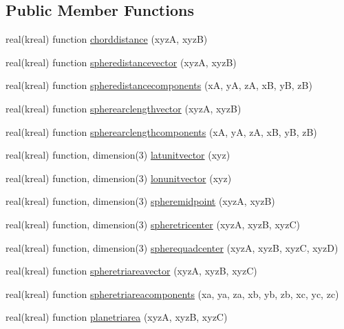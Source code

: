 \subsection*{Public Member Functions}
\begin{DoxyCompactItemize}
\item 
real(kreal) function \hyperlink{classspheregeommodule_aad8e24c2e0fcaed63257a035dd75164d}{chorddistance} (xyz\+A, xyz\+B)
\item 
real(kreal) function \hyperlink{classspheregeommodule_a7649a8382de0b1490ba0baf2a554d430}{spheredistancevector} (xyz\+A, xyz\+B)
\item 
real(kreal) function \hyperlink{classspheregeommodule_a5e3a3578ed0119cf1082a34071e46531}{spheredistancecomponents} (x\+A, y\+A, z\+A, x\+B, y\+B, z\+B)
\item 
real(kreal) function \hyperlink{classspheregeommodule_a45bc66c78ad0038406b7520f20fde3c1}{spherearclengthvector} (xyz\+A, xyz\+B)
\item 
real(kreal) function \hyperlink{classspheregeommodule_af1c6c8b85f05774efc228e087da7ea8c}{spherearclengthcomponents} (x\+A, y\+A, z\+A, x\+B, y\+B, z\+B)
\item 
real(kreal) function, dimension(3) \hyperlink{classspheregeommodule_ac645580642ca887dfc32d3f079817474}{latunitvector} (xyz)
\item 
real(kreal) function, dimension(3) \hyperlink{classspheregeommodule_a5dfabb07e42694a7361c6205944d1945}{lonunitvector} (xyz)
\item 
real(kreal) function, dimension(3) \hyperlink{classspheregeommodule_a0bf72172c13a5b95a0b53340c7619963}{spheremidpoint} (xyz\+A, xyz\+B)
\item 
real(kreal) function, dimension(3) \hyperlink{classspheregeommodule_a18eb91568cb8323bc53585d96e2a8ce5}{spheretricenter} (xyz\+A, xyz\+B, xyz\+C)
\item 
real(kreal) function, dimension(3) \hyperlink{classspheregeommodule_a2910c82f169f0e582969b7be3d876930}{spherequadcenter} (xyz\+A, xyz\+B, xyz\+C, xyz\+D)
\item 
real(kreal) function \hyperlink{classspheregeommodule_a42542d4632cdf4162e47451f56663b75}{spheretriareavector} (xyz\+A, xyz\+B, xyz\+C)
\item 
real(kreal) function \hyperlink{classspheregeommodule_a830acd2d8e49b84b9f93e2f63da5e09d}{spheretriareacomponents} (xa, ya, za, xb, yb, zb, xc, yc, zc)
\item 
real(kreal) function \hyperlink{classspheregeommodule_a54a19e79b6aa0ca3e40eec85e5438402}{planetriarea} (xyz\+A, xyz\+B, xyz\+C)

\end{DoxyCompactItemize}
